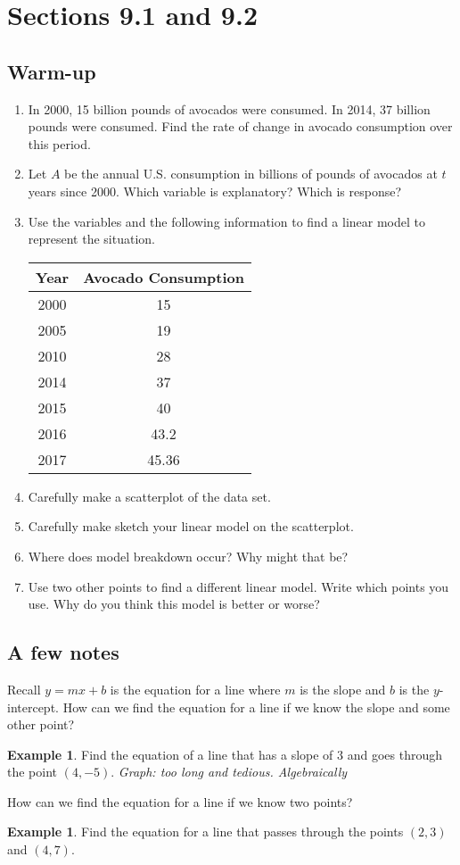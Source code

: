 \documentclass[11pt]{scrartcl}
\theoremstyle{definition}
\newtheorem{example}[theorem]{Example}
\begin{document}

\section*{Sections 9.1 and 9.2}
\subsection*{Warm-up}
\begin{enumerate}
	\item In 2000, 15 billion pounds of avocados were consumed. In 2014, 37 billion pounds were consumed. Find the rate of change in avocado consumption over this period.
	\item Let $A$ be the annual U.S. consumption in billions of pounds of avocados at $t$ years since 2000. Which variable is explanatory? Which is response?
	\item Use the variables and the following information to find a linear model to represent the situation. \begin{center}
		\begin{tabular}{c|c}
Year & Avocado Consumption \\\hline
2000 & 15                  \\
2005 & 19                  \\
2010 & 28                  \\
2014 & 37                  \\
2015 & 40                  \\
2016 & 43.2                \\
2017 & 45.36              
\end{tabular}
	\end{center}
	\item Carefully make a scatterplot of the data set.
	\item Carefully make sketch your linear model on the scatterplot.
	\item Where does model breakdown occur? Why might that be?
	\item Use two other points to find a different linear model. Write which points you use. Why do you think this model is better or worse?
	\end{enumerate}
	
\subsection*{A few notes}
Recall $y=mx+b$ is the equation for a line where $m$ is the slope and $b$ is the $y$-intercept. How can we find the equation for a line if we know the slope and some other point?
\begin{example}
	Find the equation of a line that has a slope of $3$ and goes through the point $(4,-5)$. \textit{Graph: too long and tedious. Algebraically}
\end{example}	
How can we find the equation for a line if we know two points?
\begin{example}
	Find the equation for a line that passes through the points $(2,3)$ and $(4,7)$.
\end{example}
\end{document}
